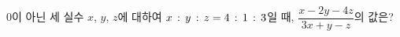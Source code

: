 $0$이 아닌 세 실수 $x$, $y$, $z$에 대하여 $x\mkern3mu :\mkern3mu y\mkern3mu :\mkern3mu z=4\mkern3mu :\mkern3mu 1\mkern3mu :\mkern3mu 3$일 때, $\dfrac{x-2y-4z}{3x+y-z}$의 값은?
